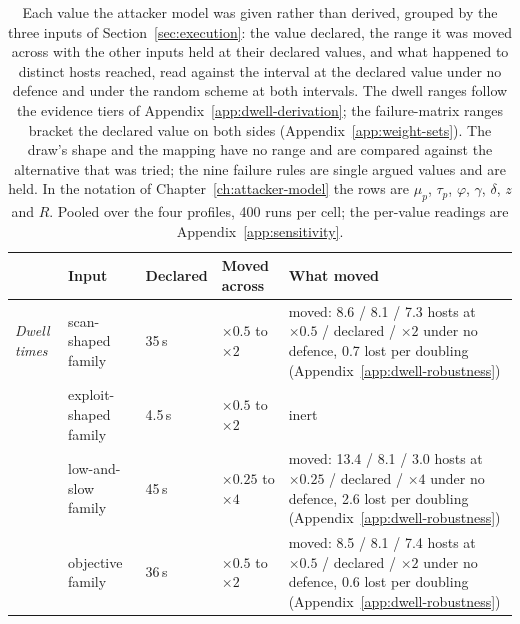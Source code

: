 
\begin{table}[H]
  \centering
  \caption[The declared inputs and what moved]{Each value the attacker model was given rather than derived, grouped by the three inputs of Section~\ref{sec:execution}: the value declared, the range it was moved across with the other inputs held at their declared values, and what happened to distinct hosts reached, read against the interval at the declared value under no defence and under the random scheme at both intervals. The dwell ranges follow the evidence tiers of Appendix~\ref{app:dwell-derivation}; the failure-matrix ranges bracket the declared value on both sides (Appendix~\ref{app:weight-sets}). The draw's shape and the mapping have no range and are compared against the alternative that was tried; the nine failure rules are single argued values and are held. In the notation of Chapter~\ref{ch:attacker-model} the rows are $\mu_p$, $\tau_p$, $\varphi$, $\gamma$, $\delta$, $z$ and $R$. Pooled over the four profiles, 400 runs per cell; the per-value readings are Appendix~\ref{app:sensitivity}.}
  \label{tab:parameter-register}
  \tablestyle\setlength{\tabcolsep}{4pt}
  \begin{tabular}{@{}P{1.6cm}P{2.8cm}P{1.9cm}P{2.5cm}P{6.4cm}@{}}
    \toprule
    & Input & Declared & Moved across & What moved \\
    \midrule
    \emph{Dwell times} & scan-shaped family & 35\,s & $\times0.5$ to $\times2$ & moved: 8.6 / 8.1 / 7.3 hosts at $\times0.5$ / declared / $\times2$ under no defence, 0.7 lost per doubling (Appendix~\ref{app:dwell-robustness}) \\
     & exploit-shaped family & 4.5\,s & $\times0.5$ to $\times2$ & inert \\
     & low-and-slow family & 45\,s & $\times0.25$ to $\times4$ & moved: 13.4 / 8.1 / 3.0 hosts at $\times0.25$ / declared / $\times4$ under no defence, 2.6 lost per doubling (Appendix~\ref{app:dwell-robustness}) \\
     & objective family & 36\,s & $\times0.5$ to $\times2$ & moved: 8.5 / 8.1 / 7.4 hosts at $\times0.5$ / declared / $\times2$ under no defence, 0.6 lost per doubling (Appendix~\ref{app:dwell-robustness}) \\

\end{tabular}
\end{table}
